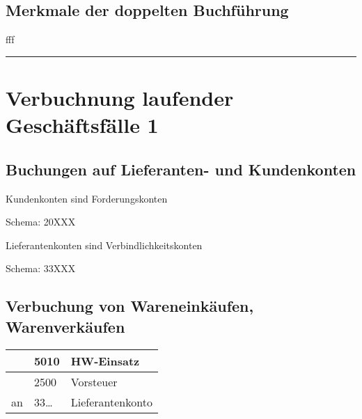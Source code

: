 \documentclass[letterpaper,10pt,english]{sphinxmanual}
\begin{document}
\subsection{Merkmale der doppelten Buchführung}
\label{\detokenize{pool1:merkmale-der-doppelten-buchfuhrung}}
fff


\bigskip\hrule\bigskip



\section{Verbuchnung laufender Geschäftsfälle 1}
\label{\detokenize{pool1:verbuchnung-laufender-geschaftsfalle-1}}

\subsection{Buchungen auf Lieferanten- und Kundenkonten}
\label{\detokenize{pool1:buchungen-auf-lieferanten-und-kundenkonten}}
\begin{DUlineblock}{0em}
\item[] 
\item[] Kundenkonten sind Forderungskonten
\item[] Schema: 20XXX
\end{DUlineblock}

\begin{DUlineblock}{0em}
\item[] 
\item[] Lieferantenkonten sind Verbindlichkeitskonten
\item[] Schema: 33XXX
\end{DUlineblock}


\subsection{Verbuchung von Wareneinkäufen, Warenverkäufen}
\label{\detokenize{pool1:verbuchung-von-wareneinkaufen-warenverkaufen}}


\begin{savenotes}\sphinxattablestart
\centering
\begin{tabulary}{\linewidth}[t]{|T|T|T|}
\hline
&
5010
&
HW-Einsatz
\\
\hline&
2500
&
Vorsteuer
\\
\hline
an
&
33…
&
Lieferantenkonto
\\
\hline
\end{tabulary}
\par
\sphinxattableend\end{savenotes}
\end{document}
